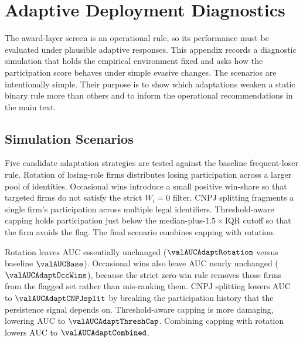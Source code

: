 \section{Adaptive Deployment Diagnostics}
\label{app:strategic_adaptation_submission}

The award-layer screen is an operational rule, so its performance
must be evaluated under plausible adaptive responses. This
appendix records a diagnostic simulation that holds the empirical
environment fixed and asks how the participation score behaves
under simple evasive changes. The scenarios are intentionally
simple. Their purpose is to show which adaptations weaken a
static binary rule more than others and to inform the operational
recommendations in the main text.

\subsection{Simulation Scenarios}
\label{app:adaptation_scenarios_submission}

Five candidate adaptation strategies are tested against the
baseline frequent-loser rule. Rotation of losing-role firms
distributes losing participation across a larger pool of
identities. Occasional wins introduce a small positive
win-share so that targeted firms do not satisfy the strict
$W_i=0$ filter. CNPJ splitting fragments a single firm's
participation across multiple legal identifiers. Threshold-aware
capping holds participation just below the median-plus-$1.5\times$IQR
cutoff so that the firm avoids the flag. The final scenario
combines capping with rotation.

Rotation leaves AUC essentially unchanged
($\valAUCAdaptRotation$ versus baseline $\valAUCBase$).
Occasional wins also leave AUC nearly unchanged
($\valAUCAdaptOccWins$), because the strict zero-win rule
removes those firms from the flagged set rather than
mis-ranking them. CNPJ splitting lowers AUC to
$\valAUCAdaptCNPJsplit$ by breaking the participation history
that the persistence signal depends on. Threshold-aware capping
is more damaging, lowering AUC to $\valAUCAdaptThreshCap$.
Combining capping with rotation lowers AUC to
$\valAUCAdaptCombined$.

